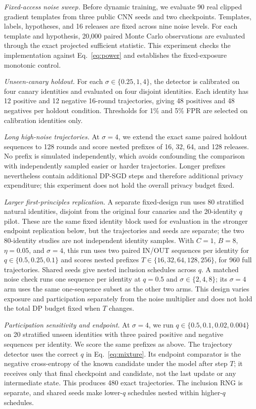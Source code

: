 \documentclass[conference]{IEEEtran}
\begin{document}
\emph{Fixed-access noise sweep.} Before dynamic training, we evaluate 90 real clipped gradient templates from three public CNN seeds and two checkpoints. Templates, labels, hypotheses, and 16 releases are fixed across nine noise levels. For each template and hypothesis, 20,000 paired Monte Carlo observations are evaluated through the exact projected sufficient statistic. This experiment checks the implementation against Eq.~\ref{eq:power} and establishes the fixed-exposure monotonic control.

\emph{Unseen-canary holdout.} For each $\sigma\in\{0.25,1,4\}$, the detector is calibrated on four canary identities and evaluated on four disjoint identities. Each identity has 12 positive and 12 negative 16-round trajectories, giving 48 positives and 48 negatives per holdout condition. Thresholds for 1\% and 5\% FPR are selected on calibration identities only.

\emph{Long high-noise trajectories.} At $\sigma=4$, we extend the exact same paired holdout sequences to 128 rounds and score nested prefixes of 16, 32, 64, and 128 releases. No prefix is simulated independently, which avoids confounding the comparison with independently sampled easier or harder trajectories. Longer prefixes nevertheless contain additional DP-SGD steps and therefore additional privacy expenditure; this experiment does not hold the overall privacy budget fixed.

\emph{Larger first-principles replication.} A separate fixed-design run uses 80 stratified natural identities, disjoint from the original four canaries and the 20-identity $q$ pilot. These are the same fixed identity block used for evaluation in the stronger endpoint replication below, but the trajectories and seeds are separate; the two 80-identity studies are not independent identity samples. With $C=1$, $B=8$, $\eta=0.05$, and $\sigma=4$, this run uses two paired IN/OUT sequences per identity for $q\in\{0.5,0.25,0.1\}$ and scores nested prefixes $T\in\{16,32,64,128,256\}$, for 960 full trajectories. Shared seeds give nested inclusion schedules across $q$. A matched noise check runs one sequence per identity at $q=0.5$ and $\sigma\in\{2,4,8\}$; its $\sigma=4$ arm uses the same one-sequence subset as the other two arms. This design varies exposure and participation separately from the noise multiplier and does not hold the total DP budget fixed when $T$ changes.

\emph{Participation sensitivity and endpoint.} At $\sigma=4$, we run $q\in\{0.5,0.1,0.02,0.004\}$ on 20 stratified unseen identities with three paired positive and negative sequences per identity. We score the same prefixes as above. The trajectory detector uses the correct $q$ in Eq.~\ref{eq:mixture}. Its endpoint comparator is the negative cross-entropy of the known candidate under the model after step $T$; it receives only that final checkpoint and candidate, not the last update or any intermediate state. This produces 480 exact trajectories. The inclusion RNG is separate, and shared seeds make lower-$q$ schedules nested within higher-$q$ schedules.
\end{document}
